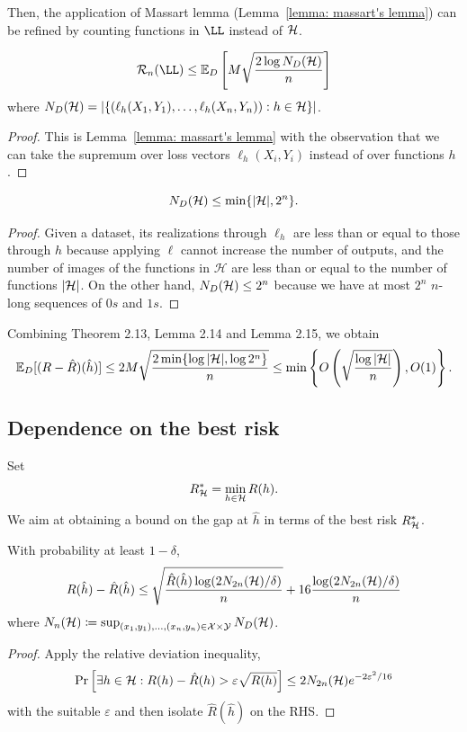 \documentclass[reqno]{amsart}
\begin{document}
Then, the application of Massart lemma (Lemma~\ref{lemma: massart's lemma}) can be refined by counting functions in $\LL$ instead of $\mathcal{H}$. 
\begin{lemma}[Massart]\label{lemma: refined massart}
\[
\mathcal R_n(\LL) \le \expv_D\left[M\sqrt{\frac{2\log N_D(\cH)}{n}}\right]
\]
where  $N_D(\mathcal{H})=\left|\left\{(\ell_h(X_1,Y_1),\ldots,\ell_h(X_n,Y_n)):h\in\mathcal{H}\right\}\right|$.
    \begin{proof}
        This is Lemma~\ref{lemma: massart's lemma} with the observation that we can take the supremum over loss vectors $\ell_h(X_i,Y_i)$ instead of over functions $h$. 
    \end{proof}
\end{lemma}

\begin{lemma}\label{lemma: counting}
\[
N_D(\mathcal{H}) \le \min\{\vert\mathcal{H}\vert, 2^n\}.
\] 
\begin{proof}
Given a dataset, its realizations through $\ell_h$ are less than or equal to those through $h$ because applying $\ell$ cannot increase the number of outputs, and the number of images of the functions in $\mathcal H$ are less than or equal to the number of functions $\vert\mathcal{H}\vert$. On the other hand, $N_D(\mathcal{H})\le 2^n$ because we have at most $2^n$ $n$-long sequences of $0s$ and $1s$.
\end{proof}
\end{lemma} 

Combining Theorem 2.13, Lemma 2.14 and Lemma 2.15, we obtain
\begin{equation}
\mathbb{E}_D[(R-\hat R) (\hat h)] \le 2M\sqrt{\frac{2\min\{\log \vert\mathcal{H}\vert, \log 2^n\}}{n}} \le \min\left\{O\left(\sqrt\frac{\log\vert\mathcal{H}\vert}{n}\right), O(1)\right\}.
\end{equation}

\subsection{Dependence on the best risk}
Set 
\[
R^*_{\mathcal{H}} = \min_{h\in\mathcal{H}} R(h).
\]
We aim at obtaining a bound on the gap at $\hat h$ in terms of the best risk $R^*_{\mathcal{H}}$.  

\begin{theorem}\label{thm: bound emprisk}
    With probability at least $1-\delta$,
    \[
    R(\hat h) - \hat R(\hat h) \le \sqrt{\frac{\hat R(\hat h)\log(2N_{2n}(\mathcal{H})/\delta)}{n}} + 16\frac{\log(2N_{2n}(\mathcal{H})/\delta)}{n}
    \]
    where $N_{n}(\mathcal{H}) \coloneq \sup_{(x_1,y_1), \ldots,(x_{n},y_{n}) \in \mathcal{X} \times \mathcal{Y}} N_D(\mathcal{H})$.

    \begin{proof}
        Apply the relative deviation inequality,
        \[
        \Pr\left[\exists h\in\mathcal{H} : R(h)-\hat R(h) > \varepsilon \sqrt{R(h)}\right] \le 2N_{2n} (\mathcal{H}) e^{-2\varepsilon^2/16}
        \]
        with the suitable $\varepsilon$ and then isolate $\hat R(\hat h)$ on the RHS.
    \end{proof}
\end{theorem}
\end{document}
